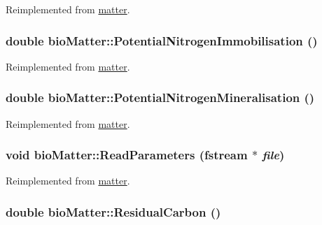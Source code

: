 Reimplemented from \hyperlink{classmatter_ad8531740a6494ac68f0223cd49d272eb}{matter}.\hypertarget{classbio_matter_a313cea693a2fb094b2e9bf591439ad3a}{
\subsubsection[{PotentialNitrogenImmobilisation}]{\setlength{\rightskip}{0pt plus 5cm}double bioMatter::PotentialNitrogenImmobilisation ()}}
\label{classbio_matter_a313cea693a2fb094b2e9bf591439ad3a}


Reimplemented from \hyperlink{classmatter_a302a5c72c1cbe1c3d62f01d07f25cd4c}{matter}.\hypertarget{classbio_matter_a10072a4f5ed6d3462c9872e4836f4adc}{
\subsubsection[{PotentialNitrogenMineralisation}]{\setlength{\rightskip}{0pt plus 5cm}double bioMatter::PotentialNitrogenMineralisation ()}}
\label{classbio_matter_a10072a4f5ed6d3462c9872e4836f4adc}


Reimplemented from \hyperlink{classmatter_a59fa9a6e0ff21bac9ab9fb5b4de9392f}{matter}.\hypertarget{classbio_matter_aa792422d773ba544fe0e70ea8d5b061e}{
\subsubsection[{ReadParameters}]{\setlength{\rightskip}{0pt plus 5cm}void bioMatter::ReadParameters (fstream $\ast$ {\em file})}}
\label{classbio_matter_aa792422d773ba544fe0e70ea8d5b061e}


Reimplemented from \hyperlink{classmatter_a8418c63bc2206df9cb0de19aa195eeac}{matter}.\hypertarget{classbio_matter_aa432cb13da2d6c6a800e45bfcad5654b}{
\subsubsection[{ResidualCarbon}]{\setlength{\rightskip}{0pt plus 5cm}double bioMatter::ResidualCarbon ()}}
\label{classbio_matter_aa432cb13da2d6c6a800e45bfcad5654b}


